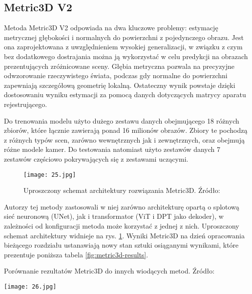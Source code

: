 \subsection{Metric3D V2}
Metoda Metric3D V2 \cite{hu2024} odpowiada na dwa kluczowe problemy: estymację metrycznej głębokości i normalnych do powierzchni z pojedynczego obrazu. Jest ona zaprojektowana z uwzględnieniem wysokiej generalizacji, w związku z czym bez dodatkowego dostrajania można ją wykorzystać w celu predykcji na obrazach prezentujących zróżnicowane sceny.
Głębia metryczna pozwala na precyzyjne odwzorowanie rzeczywistego świata, podczas gdy normalne do powierzchni zapewniają szczegółową geometrię lokalną. Ostateczny wynik powstaje dzięki dostosowaniu wyniku estymacji za pomocą danych dotyczących matrycy aparatu rejestrującego. 

Do trenowania modelu użyto dużego zestawu danych obejmującego 18 różnych zbiorów, które łącznie zawierają ponad 16 milionów obrazów. Zbiory te pochodzą z różnych typów scen, zarówno wewnętrznych jak i zewnętrznych, oraz obejmują różne modele kamer. Do testowania natomiast użyto zestawów danych 7 zestawów częściowo pokrywających się z zestawami uczącymi.

\begin{figure}[H]
    \centering
    \texttt{[image: 25.jpg]}
    \caption{Uproszczony schemat architektury rozwiązania Metric3D. Źródło: \cite{hu2024}}
    \label{fig:metric3d-schema}
\end{figure}

Autorzy tej metody zastosowali w niej zarówno architekturę opartą o splotową sieć neuronową (UNet), jak i transformator (ViT i DPT jako dekoder), w zależności od konfiguracji metoda może korzystać z jednej z nich. Uproszczony schemat architektury widnieje na rys. \ref{fig:metric3d-schema}. Wyniki Metric3D na dzień opracowania bieżącego rozdziału ustanawiają nowy stan sztuki osiąganymi wynikami, które prezentuje poniższa tabela \ref{fig:metric3d-results}.
\begin{table}[H]
    \centering
    \caption{Porównanie rezultatów Metric3D do innych wiodących metod. Źródło: \cite{hu2024}}
    \texttt{[image: 26.jpg]}
    \label{fig:metric3d-results}
\end{table}

